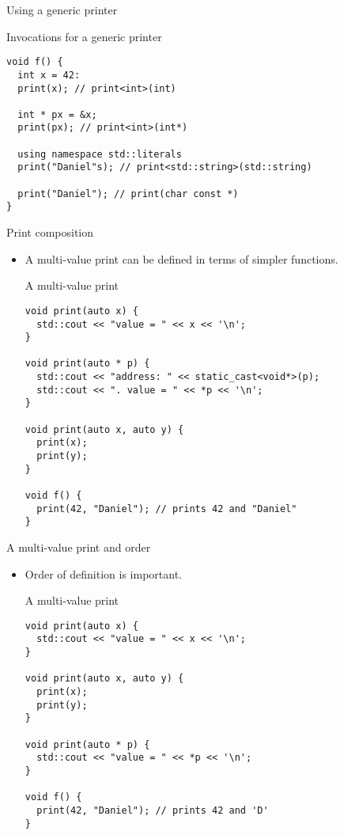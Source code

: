 \begin{frame}[t,fragile]{Using a generic printer}
\begin{block}{Invocations for a generic printer}
\begin{lstlisting}
void f() {
  int x = 42:
  print(x); // print<int>(int)

  int * px = &x;
  print(px); // print<int>(int*)

  using namespace std::literals
  print("Daniel"s); // print<std::string>(std::string)

  print("Daniel"); // print(char const *)
}
\end{lstlisting}
\end{block}
\end{frame}

\begin{frame}[t,fragile,shrink=15]{Print composition}
\begin{itemize}
  \item A multi-value print can be defined in terms of simpler functions.

\begin{block}{A multi-value print}
\begin{lstlisting}
void print(auto x) {
  std::cout << "value = " << x << '\n';
}

void print(auto * p) {
  std::cout << "address: " << static_cast<void*>(p);
  std::cout << ". value = " << *p << '\n';
}

void print(auto x, auto y) {
  print(x);
  print(y);
}

void f() {
  print(42, "Daniel"); // prints 42 and "Daniel"
}
\end{lstlisting}
\end{block}

\end{itemize}
\end{frame}

\begin{frame}[t,fragile,shrink=15]{A multi-value print and order}
\begin{itemize}

  \item Order of definition is important.

\begin{block}{A multi-value print}
\begin{lstlisting}
void print(auto x) {
  std::cout << "value = " << x << '\n';
}

void print(auto x, auto y) {
  print(x);
  print(y);
}

void print(auto * p) {
  std::cout << "value = " << *p << '\n';
}

void f() {
  print(42, "Daniel"); // prints 42 and 'D'
}
\end{lstlisting}
\end{block}

\end{itemize}
\end{frame}

